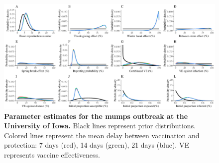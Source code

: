 \documentclass[12pt]{article}
\begin{document}
\pagebreak 

\begin{figure}[!h]
\includegraphics[width=\textwidth]{../figure_stanfit_seirv_final/figure_stanfit_param_all.pdf}
\caption{
\textbf{Parameter estimates for the mumps outbreak at the University of Iowa.}
Black lines represent prior distributions.
Colored lines represent the mean delay between vaccination and protection: 7 days (red), 14 days (green), 21 days (blue).
VE represents vaccine effectiveness.
}
\label{fig:param}
\end{figure}

\pagebreak


\end{document}
